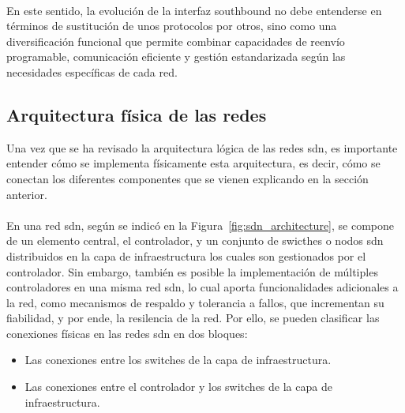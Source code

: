 \\
En este sentido, la evolución de la interfaz southbound no debe entenderse en términos de sustitución de unos protocolos por otros, sino como una diversificación funcional que permite combinar capacidades de reenvío programable, comunicación eficiente y gestión estandarizada según las necesidades específicas de cada red.


\subsection{Arquitectura física de las redes }
\label{subsec:arquitectura_fisica_sdn}

Una vez que se ha revisado la arquitectura lógica de las redes \gls{sdn}, es importante entender cómo se implementa físicamente esta arquitectura, es decir, cómo se conectan los diferentes componentes que se vienen explicando en la sección anterior.\\
\\
En una red \gls{sdn}, según se indicó en la Figura~\ref{fig:sdn_architecture}, se compone de un elemento central, el controlador, y un conjunto de swicthes o nodos \gls{sdn} distribuidos en la capa de infraestructura los cuales son gestionados por el controlador. Sin embargo, también es posible la implementación de múltiples controladores en una misma red \gls{sdn}, lo cual aporta funcionalidades adicionales a la red, como mecanismos de respaldo y tolerancia a fallos, que incrementan su fiabilidad, y por ende, la resilencia de la red. Por ello, se pueden clasificar las conexiones físicas en las redes \gls{sdn} en dos bloques:  

\begin{itemize}
    \item Las conexiones entre los switches de la capa de infraestructura.
    \item Las conexiones entre el controlador y los switches de la capa de infraestructura.
\end{itemize}
 
